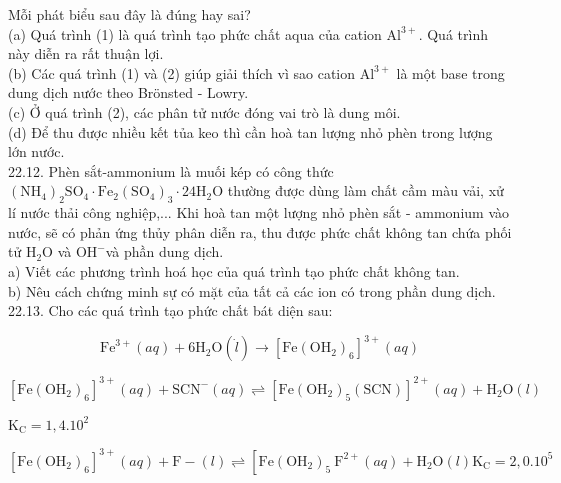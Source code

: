 \documentclass[10pt]{article}
\begin{document}
Mỗi phát biểu sau đây là đúng hay sai?\\
(a) Quá trình (1) là quá trình tạo phức chất aqua của cation $\mathrm{Al}^{3+}$. Quá trình này diễn ra rất thuận lợi.\\
(b) Các quá trình (1) và (2) giúp giải thích vì sao cation $\mathrm{Al}^{3+}$ là một base trong dung dịch nước theo Brönsted - Lowry.\\
(c) Ở quá trình (2), các phân tử nước đóng vai trò là dung môi.\\
(d) Để thu được nhiều kết tủa keo thì cần hoà tan lượng nhỏ phèn trong lượng lớn nước.\\
22.12. Phèn sắt-ammonium là muối kép có công thức $\left(\mathrm{NH}_{4}\right)_{2} \mathrm{SO}_{4} \cdot \mathrm{Fe}_{2}\left(\mathrm{SO}_{4}\right)_{3} \cdot 24 \mathrm{H}_{2} \mathrm{O}$ thường được dùng làm chất cầm màu vải, xử lí nước thải công nghiệp,... Khi hoà tan một lượng nhỏ phèn sắt - ammonium vào nước, sẽ có phản ứng thủy phân diễn ra, thu được phức chất không tan chứa phối tử $\mathrm{H}_{2} \mathrm{O}$ và $\mathrm{OH}^{-}$và phần dung dịch.\\
a) Viết các phương trình hoá học của quá trình tạo phức chất không tan.\\
b) Nêu cách chứng minh sự có mặt của tất cả các ion có trong phần dung dịch.\\
22.13. Cho các quá trình tạo phức chất bát diện sau:


\begin{equation*}
\mathrm{Fe}^{3+}(a q)+6 \mathrm{H}_{2} \mathrm{O}(\dot{l}) \rightarrow\left[\mathrm{Fe}\left(\mathrm{OH}_{2}\right)_{6}\right]^{3+}(a q) \tag{I}
\end{equation*}



\begin{equation*}
\left[\mathrm{Fe}\left(\mathrm{OH}_{2}\right)_{6}\right]^{3+}(a q)+\mathrm{SCN}^{-}(a q) \rightleftharpoons\left[\mathrm{Fe}\left(\mathrm{OH}_{2}\right)_{5}(\mathrm{SCN})\right]^{2+}(a q)+\mathrm{H}_{2} \mathrm{O}(l) \tag{II}
\end{equation*}


$\mathrm{K}_{\mathrm{C}}=1,4.10^{2}$


\begin{equation*}
\left[\mathrm{Fe}\left(\mathrm{OH}_{2}\right)_{6}\right]^{3+}(a q)+\mathrm{F}-(l) \rightleftharpoons\left[\mathrm{Fe}\left(\mathrm{OH}_{2}\right)_{5} \mathrm{~F}^{2+}(a q)+\mathrm{H}_{2} \mathrm{O}(l) \mathrm{K}_{\mathrm{C}}=2,0.10^{5}\right. \tag{III}
\end{equation*}
\end{document}
